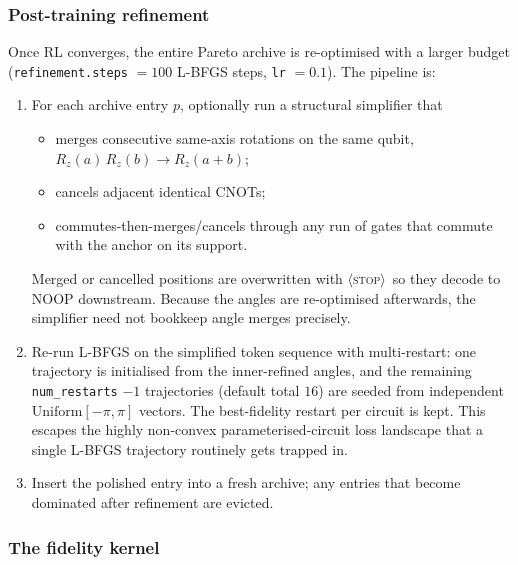 \documentclass[11pt,a4paper]{article}
\newcommand{\STOP}{\ifmmode\langle\text{\textsc{stop}}\rangle\else$\langle$\textsc{stop}$\rangle$\fi}
\begin{document}
\subsubsection{Post-training refinement}

Once RL converges, the entire Pareto archive is re-optimised with a larger budget (\texttt{refinement.steps} $= 100$ L-BFGS steps, \texttt{lr} $= 0.1$). The pipeline is:
\begin{enumerate}[leftmargin=2em]
  \item For each archive entry $p$, optionally run a structural simplifier that
    \begin{itemize}
      \item merges consecutive same-axis rotations on the same qubit, $R_z(a)\,R_z(b) \to R_z(a+b)$;
      \item cancels adjacent identical CNOTs;
      \item commutes-then-merges/cancels through any run of gates that commute with the anchor on its support.
    \end{itemize}
    Merged or cancelled positions are overwritten with \STOP\ so they decode to NOOP downstream. Because the angles are re-optimised afterwards, the simplifier need not bookkeep angle merges precisely.
  \item Re-run L-BFGS on the simplified token sequence with multi-restart: one trajectory is initialised from the inner-refined angles, and the remaining \texttt{num\_restarts} $- 1$ trajectories (default total $16$) are seeded from independent $\mathrm{Uniform}[-\pi, \pi]$ vectors. The best-fidelity restart per circuit is kept. This escapes the highly non-convex parameterised-circuit loss landscape that a single L-BFGS trajectory routinely gets trapped in.
  \item Insert the polished entry into a fresh archive; any entries that become dominated after refinement are evicted.
\end{enumerate}

\subsubsection{The fidelity kernel}
\end{document}
